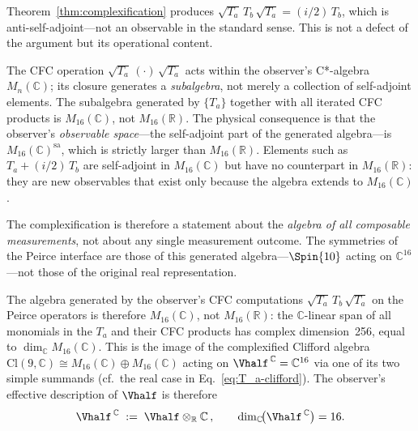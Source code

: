 \begin{remark}
\label{rem:sp-output}
Theorem~\ref{thm:complexification} produces
$\sqrt{T_a}\,T_b\,\sqrt{T_a} = (i/2)\,T_b$, which is
anti-self-adjoint---not an observable in the standard sense.
This is not a defect of the argument but its operational content.

The CFC operation $\sqrt{T_a}\,(\cdot)\,\sqrt{T_a}$ acts within the observer's
C*-algebra $M_n(\mathbb{C})$; its closure generates a
\emph{subalgebra}, not merely a collection of self-adjoint elements.
The subalgebra generated by $\{T_a\}$ together with all iterated
CFC products is $M_{16}(\mathbb{C})$, not
$M_{16}(\mathbb{R})$.  The physical consequence is that the
observer's \emph{observable space}---the self-adjoint part of the
generated algebra---is $M_{16}(\mathbb{C})^{\mathrm{sa}}$, which is
strictly larger than $M_{16}(\mathbb{R})$.  Elements such as
$T_a + (i/2)\,T_b$ are self-adjoint in $M_{16}(\mathbb{C})$ but
have no counterpart in $M_{16}(\mathbb{R})$: they are new
observables that exist only because the algebra extends to
$M_{16}(\mathbb{C})$.

The complexification is therefore a statement about the
\emph{algebra of all composable measurements}, not about any single
measurement outcome.  The symmetries of the Peirce interface are
those of this generated algebra---$\Spin{10}$ acting on
$\mathbb{C}^{16}$---not those of the original real
representation.
\end{remark}

The algebra generated by the observer's CFC computations
$\sqrt{T_a}\,T_b\,\sqrt{T_a}$ on the
Peirce operators is therefore $M_{16}(\mathbb{C})$, not
$M_{16}(\mathbb{R})$: the $\mathbb{C}$-linear span of all monomials
in the $T_a$ and their CFC products has complex dimension~256,
equal to $\dim_\mathbb{C} M_{16}(\mathbb{C})$.  This is the image
of the complexified Clifford algebra $\mathrm{Cl}(9,\mathbb{C})
\cong M_{16}(\mathbb{C}) \oplus M_{16}(\mathbb{C})$ acting on
$\Vhalf^{\,\mathbb{C}} = \mathbb{C}^{16}$ via one of its two
simple summands (cf.\ the real case in
Eq.~\eqref{eq:T_a-clifford}).  The observer's effective description
of $\Vhalf$ is therefore
\begin{equation}\label{eq:complexification}
  \Vhalf^{\,\mathbb{C}}
  \;:=\;
  \Vhalf \otimes_\mathbb{R} \mathbb{C}\,,
  \qquad
  \dim_\mathbb{C}\!\bigl(\Vhalf^{\,\mathbb{C}}\bigr)
  = 16.
\end{equation}

